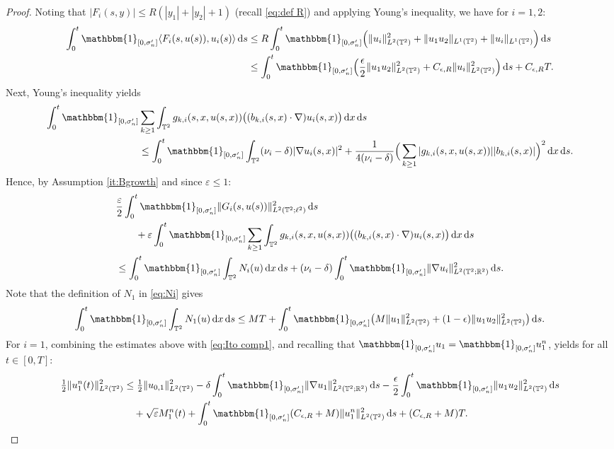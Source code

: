 \documentclass{amsart}
\newcommand{\dd}{\,\mathrm{d}}
\newcommand{\one}{\mathbbm{1}}
\newcommand{\<}{\langle}
\newcommand{\?}{\rangle}
\newcommand{\Tor}{\mathbb{T}}
\renewcommand{\Tor}{\mathbb{T}^2}
\theoremstyle{plain}
\theoremstyle{remark}
\theoremstyle{plain}
\numberwithin{equation}{section}
\def\R{{\mathbb R}}
\newcommand{\eps}{\varepsilon}
\begin{document}
\begin{proof}
Noting that $|F_i(s,y)|\leq {R}(|y_1|+|y_2|+1)$ (recall \eqref{eq:def R}) and applying Young's inequality, we have for $i=1,2$: 
\begin{align*}
\int_0^t\one_{[0,\sigma_n']}
\<F_i(s,u(s)),u_i(s)\?\dd s
&\leq R\int_0^t\one_{[0,\sigma_n']}
\Big(\|u_i\|_{L^2(\Tor)}^2+\|u_1u_2\|_{L^1(\Tor)}+\|u_i\|_{L^1(\Tor)}\Big)\dd s\\
&\leq\int_0^t\one_{[0,\sigma_n']}\Big(\frac{\epsilon}{2}\|u_1u_2\|_{L^2(\Tor)}^2
+C_{\epsilon,R}\|u_i\|_{L^2(\Tor)}^2\Big)\dd s+C_{\epsilon,R}T.
\end{align*}
Next, Young's inequality yields
\begin{align*}
  \int_0^t\one_{[0,\sigma_n']}&\sum_{k\geq 1}\int_{\Tor}g_{k,i}(s,x,u(s,x))\big((b_{k,i}(s,x)\cdot\nabla)u_i(s,x)\big)\dd x\dd s\\
  &\leq \int_0^t\one_{[0,\sigma_n']} \int_{\Tor}(\nu_i-\delta)|\nabla u_i(s,x)|^2+\frac{1}{4(\nu_i-\delta)}\Big(\sum_{k\geq 1}|g_{k,i}(s,x,u(s,x))| |b_{k,i}(s,x)|\Big)^2\dd x\dd s.
\end{align*}
Hence, by Assumption \ref{it:Bgrowth} and since $\eps\leq 1$:
\begin{align*}
&\frac{\eps}{2}\int_0^t\one_{[0,\sigma_n']}\|G_i(s,u(s))\|_{L^2(\Tor;\ell^2)}^2\dd s\\
   &\qquad+\eps\int_0^t \one_{[0,\sigma_n']}\sum_{k\geq 1}\int_{\Tor}g_{k,i}(s,x,u(s,x))\big((b_{k,i}(s,x)\cdot\nabla)u_i(s,x)\big)\dd x\dd s\\
&\leq   \int_0^t\one_{[0,\sigma_n']} \int_{\Tor} N_i(u)\dd x\dd s+(\nu_i-\delta)\int_0^t \one_{[0,\sigma_n']}\|\nabla u_i\|_{L^2(\Tor;\R^2)}^2\dd s.  
\end{align*}
Note that   the definition of $N_1$ in \eqref{eq:Ni} gives
\[
\int_0^t \one_{[0,\sigma_n']}\int_{\Tor} N_1(u)\dd x\dd s\leq MT+ \int_0^t \one_{[0,\sigma_n']}\big(M \|u_1\|_{L^2(\Tor)}^2 +(1-\epsilon)\|u_1u_2\|_{L^2(\Tor)}^2\big)\dd s.
\]
For $i=1$, combining the   estimates above with \eqref{eq:Ito comp1}, and recalling that $\one_{[0,\sigma_n']}u_1=\one_{[0,\sigma_n']}u_1^n$, yields for all $t\in[0,T]$: 
\begin{align}\label{eq:u1 est prep}
   \tfrac12 \|u_1^n(t)\|_{L^2(\Tor)}^2 &\leq \tfrac12 \|u_{0,1}\|_{L^2(\Tor)}^2 -\delta\int_0^t\one_{[0,\sigma_n']}\|\nabla u_1\|_{L^2(\Tor;\R^2)}^2\dd s-\frac{\epsilon}{2}\int_0^t\one_{[0,\sigma_n']}\| u_1 u_2\|_{L^2(\Tor)}^2 \dd s\notag\\
   &\quad+\sqrt{\eps}M_1^n(t)+ \int_0^t \one_{[0,\sigma_n']}(C_{\epsilon,R}+M) \|u_1^n\|_{L^2(\Tor)}^2 \dd s+(C_{\epsilon,R}+M)T.
\end{align}   


\end{proof}
\end{document}
